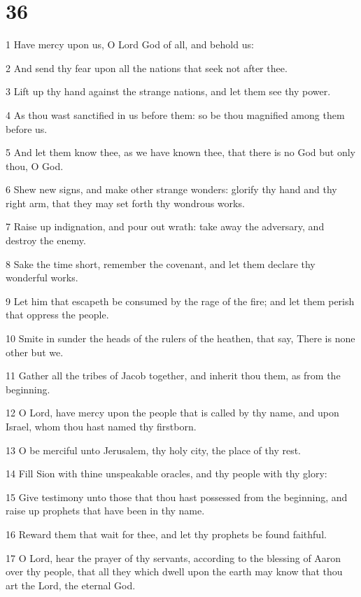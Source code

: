 \chapter{36}

\par 1 Have mercy upon us, O Lord God of all, and behold us:
\par 2 And send thy fear upon all the nations that seek not after thee.
\par 3 Lift up thy hand against the strange nations, and let them see thy power.
\par 4 As thou wast sanctified in us before them: so be thou magnified among them before us.
\par 5 And let them know thee, as we have known thee, that there is no God but only thou, O God.
\par 6 Shew new signs, and make other strange wonders: glorify thy hand and thy right arm, that they may set forth thy wondrous works.
\par 7 Raise up indignation, and pour out wrath: take away the adversary, and destroy the enemy.
\par 8 Sake the time short, remember the covenant, and let them declare thy wonderful works.
\par 9 Let him that escapeth be consumed by the rage of the fire; and let them perish that oppress the people.
\par 10 Smite in sunder the heads of the rulers of the heathen, that say, There is none other but we.
\par 11 Gather all the tribes of Jacob together, and inherit thou them, as from the beginning.
\par 12 O Lord, have mercy upon the people that is called by thy name, and upon Israel, whom thou hast named thy firstborn.
\par 13 O be merciful unto Jerusalem, thy holy city, the place of thy rest.
\par 14 Fill Sion with thine unspeakable oracles, and thy people with thy glory:
\par 15 Give testimony unto those that thou hast possessed from the beginning, and raise up prophets that have been in thy name.
\par 16 Reward them that wait for thee, and let thy prophets be found faithful.
\par 17 O Lord, hear the prayer of thy servants, according to the blessing of Aaron over thy people, that all they which dwell upon the earth may know that thou art the Lord, the eternal God.
